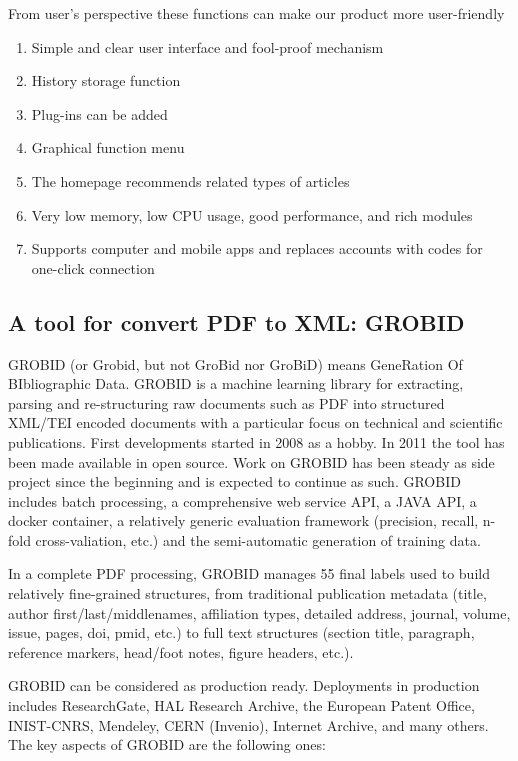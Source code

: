 \documentclass[
10pt, %
a4paper, %
oneside, %
headinclude,footinclude, %
BCOR5mm, %
]{scrartcl}
\begin{document}
From user's perspective these functions can make our product more user-friendly
\begin{enumerate}[noitemsep] %
\item Simple and clear user interface and fool-proof mechanism
\item History storage function
\item Plug-ins can be added
\item Graphical function menu
\item The homepage recommends related types of articles
\item Very low memory, low CPU usage, good performance, and rich modules
\item Supports computer and mobile apps and replaces accounts with codes for one-click connection
\end{enumerate}





\subsection{A tool for convert PDF to XML: GROBID}
GROBID (or Grobid, but not GroBid nor GroBiD) means GeneRation Of BIbliographic Data.
GROBID is a machine learning library for extracting, parsing and re-structuring raw documents such as PDF into structured XML/TEI encoded documents with a particular focus on technical and scientific publications. First developments started in 2008 as a hobby. In 2011 the tool has been made available in open source. Work on GROBID has been steady as side project since the beginning and is expected to continue as such.
GROBID includes batch processing, a comprehensive web service API, a JAVA API, a docker container, a relatively generic evaluation framework (precision, recall, n-fold cross-valiation, etc.) and the semi-automatic generation of training data.

In a complete PDF processing, GROBID manages 55 final labels used to build relatively fine-grained structures, from traditional publication metadata (title, author first/last/middlenames, affiliation types, detailed address, journal, volume, issue, pages, doi, pmid, etc.) to full text structures (section title, paragraph, reference markers, head/foot notes, figure headers, etc.).

GROBID can be considered as production ready. Deployments in production includes ResearchGate, HAL Research Archive, the European Patent Office, INIST-CNRS, Mendeley, CERN (Invenio), Internet Archive, and many others.
The key aspects of GROBID are the following ones:
\end{document}
